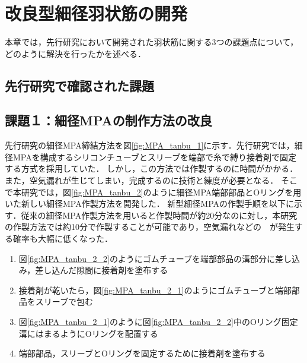 \newpage
\section{改良型細径羽状筋の開発}
本章では，先行研究\cite{hasegawa}において開発された羽状筋に関する3つの課題点について，どのように解決を行ったかを述べる．
\subsection{先行研究で確認された課題}
\subsection{課題１：細径MPAの制作方法の改良}
先行研究の細径MPA締結方法を図\ref{fig:MPA_tanbu_1}に示す．先行研究では，細径MPAを構成するシリコンチューブとスリーブを端部で糸で縛り接着剤で固定する方式を採用していた．
しかし，この方法では作製するのに時間がかかる．また，空気漏れが生じてしまい，完成するのに技術と練度が必要となる．
そこで本研究では，図\ref{fig:MPA_tanbu_2}のように細径MPA端部部品とOリングを用いた新しい細径MPA作製方法を開発した．
新型細径MPAの作製手順を以下に示す．従来の細径MPA作製方法を用いると作製時間が約20分なのに対し，本研究の作製方法では約10分で作製することが可能であり，空気漏れなどの　が発生する確率も大幅に低くなった．
\vspace{3mm}
\begin{enumerate}
  \item 図\ref{fig:MPA_tanbu_2_2}のようにゴムチューブを端部部品の溝部分に差し込み，差し込んだ隙間に接着剤を塗布する
  \item 接着剤が乾いたら，図\ref{fig:MPA_tanbu_2_1}のようにゴムチューブと端部部品をスリーブで包む
  \item 図\ref{fig:MPA_tanbu_2_1}のように図\ref{fig:MPA_tanbu_2_2}中のOリング固定溝にはまるようにOリングを配置する
  \item 端部部品，スリーブとOリングを固定するために接着剤を塗布する
\end{enumerate}
